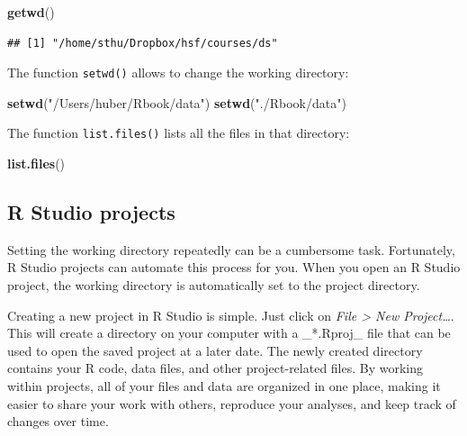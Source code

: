\documentclass[
  12pt,
  oneside]{book}
\newenvironment{Shaded}{\begin{snugshade}}{\end{snugshade}}
\newcommand{\FunctionTok}[1]{\textcolor[rgb]{0.13,0.29,0.53}{\textbf{#1}}}
\newcommand{\NormalTok}[1]{#1}
\newcommand{\StringTok}[1]{\textcolor[rgb]{0.31,0.60,0.02}{#1}}
\begin{document}
\begin{Shaded}
\begin{Highlighting}[]
\FunctionTok{getwd}\NormalTok{()}
\end{Highlighting}
\end{Shaded}

\begin{verbatim}
## [1] "/home/sthu/Dropbox/hsf/courses/ds"
\end{verbatim}

The function \texttt{setwd()} allows to change the working directory:

\begin{Shaded}
\begin{Highlighting}[]
\FunctionTok{setwd}\NormalTok{(}\StringTok{"/Users/huber/Rbook/data"}\NormalTok{)}
\FunctionTok{setwd}\NormalTok{(}\StringTok{"./Rbook/data"}\NormalTok{)}
\end{Highlighting}
\end{Shaded}

The function \texttt{list.files()} lists all the files in that directory:

\begin{Shaded}
\begin{Highlighting}[]
\FunctionTok{list.files}\NormalTok{()}
\end{Highlighting}
\end{Shaded}

\hypertarget{sec:rstudioprojects}{%
\subsection{R Studio projects}\label{sec:rstudioprojects}}

Setting the working directory repeatedly can be a cumbersome task. Fortunately, R Studio projects can automate this process for you. When you open an R Studio project, the working directory is automatically set to the project directory.

Creating a new project in R Studio is simple. Just click on \emph{File \textgreater{} New Project\ldots{}}. This will create a directory on your computer with a \_*.Rproj\_ file that can be used to open the saved project at a later date. The newly created directory contains your R code, data files, and other project-related files. By working within projects, all of your files and data are organized in one place, making it easier to share your work with others, reproduce your analyses, and keep track of changes over time.
\end{document}
